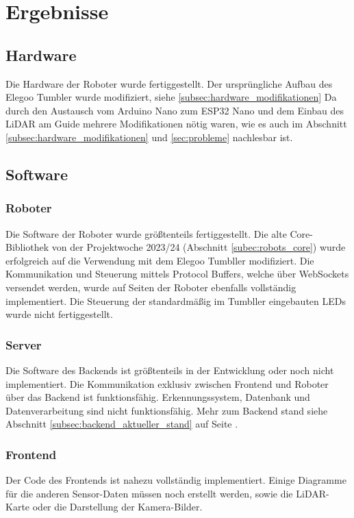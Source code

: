 \chapter{Ergebnisse}

\section{Hardware}
Die Hardware der Roboter wurde fertiggestellt.
Der ursprüngliche Aufbau des Elegoo Tumbler wurde modifiziert, siehe \ref{subsec:hardware_modifikationen}
Da durch den Austausch vom Arduino Nano zum ESP32 Nano und dem Einbau des LiDAR am Guide
mehrere Modifikationen nötig waren,
wie es auch im Abschnitt \ref{subsec:hardware_modifikationen} und \ref{sec:probleme} nachlesbar ist.
\section{Software}

\subsection{Roboter}
Die Software der Roboter wurde größtenteils fertiggestellt.
%
Die alte Core-Bibliothek von der Projektwoche 2023/24 (Abschnitt \ref{subec:robots_core})
wurde erfolgreich auf die Verwendung mit dem Elegoo Tumbller modifiziert.
%
Die Kommunikation und Steuerung mittels Protocol Buffers,
welche über WebSockets versendet werden,
wurde auf Seiten der Roboter ebenfalls vollständig implementiert.
%
Die Steuerung der standardmäßig im Tumbller eingebauten LEDs wurde nicht fertiggestellt.
\subsection{Server}
Die Software des Backends ist größtenteils in der Entwicklung 
oder noch nicht implementiert.
% 
Die Kommunikation exklusiv zwischen Frontend und Roboter 
über das Backend ist funktionsfähig.
% 
Erkennungssystem, Datenbank und Datenverarbeitung sind nicht funktionsfähig.
% 
% 
Mehr zum Backend stand siehe Abschnitt \ref{subsec:backend_aktueller_stand} 
auf Seite \pageref{subsec:backend_aktueller_stand}.
% 
\subsection{Frontend}
Der Code des Frontends ist nahezu vollständig implementiert.
%
Einige Diagramme für die anderen Sensor-Daten müssen noch erstellt werden,
sowie die LiDAR-Karte oder die Darstellung der Kamera-Bilder.

